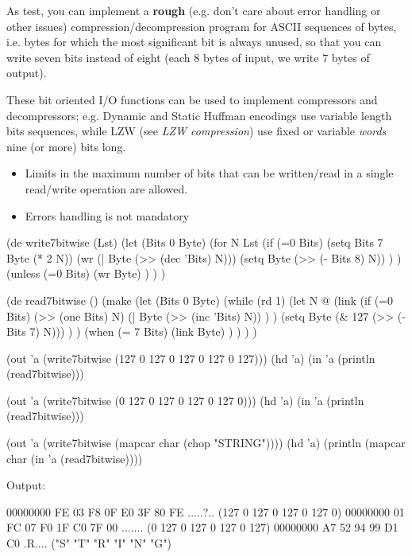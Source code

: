 As test, you can implement a \textbf{rough} (e.g. don't care about error
handling or other issues) compression/decompression program for ASCII
sequences of bytes, i.e. bytes for which the most significant bit is
always unused, so that you can write seven bits instead of eight (each 8
bytes of input, we write 7 bytes of output).

These bit oriented I/O functions can be used to implement compressors
and decompressors; e.g. Dynamic and Static Huffman encodings use
variable length bits sequences, while LZW (see \emph{LZW compression})
use fixed or variable \emph{words} nine (or more) bits long.

\begin{itemize}
\item
  Limits in the maximum number of bits that can be written/read in a
  single read/write operation are allowed.
\end{itemize}

\begin{itemize}
\item
  Errors handling is not mandatory
\end{itemize}


\begin{wideverbatim}

(de write7bitwise (Lst)
   (let (Bits 0  Byte)
      (for N Lst
         (if (=0 Bits)
            (setq Bits 7  Byte (* 2 N))
            (wr (| Byte (>> (dec 'Bits) N)))
            (setq Byte (>> (- Bits 8) N)) ) )
      (unless (=0 Bits)
         (wr Byte) ) ) )

(de read7bitwise ()
   (make
      (let (Bits 0  Byte)
         (while (rd 1)
            (let N @
               (link
                  (if (=0 Bits)
                     (>> (one Bits) N)
                     (| Byte (>> (inc 'Bits) N)) ) )
               (setq Byte (\& 127 (>> (- Bits 7) N))) ) )
         (when (= 7 Bits)
            (link Byte) ) ) ) )


(out 'a (write7bitwise (127 0 127 0 127 0 127 0 127)))
(hd 'a)
(in 'a (println (read7bitwise)))

(out 'a (write7bitwise (0 127 0 127 0 127 0 127 0)))
(hd 'a)
(in 'a (println (read7bitwise)))

(out 'a (write7bitwise (mapcar char (chop "STRING"))))
(hd 'a)
(println (mapcar char (in 'a (read7bitwise))))

Output:

00000000  FE 03 F8 0F E0 3F 80 FE                          .....?..
(127 0 127 0 127 0 127 0)
00000000  01 FC 07 F0 1F C0 7F 00                          .......
(0 127 0 127 0 127 0 127)
00000000  A7 52 94 99 D1 C0                                .R....
("S" "T" "R" "I" "N" "G")

\end{wideverbatim}

